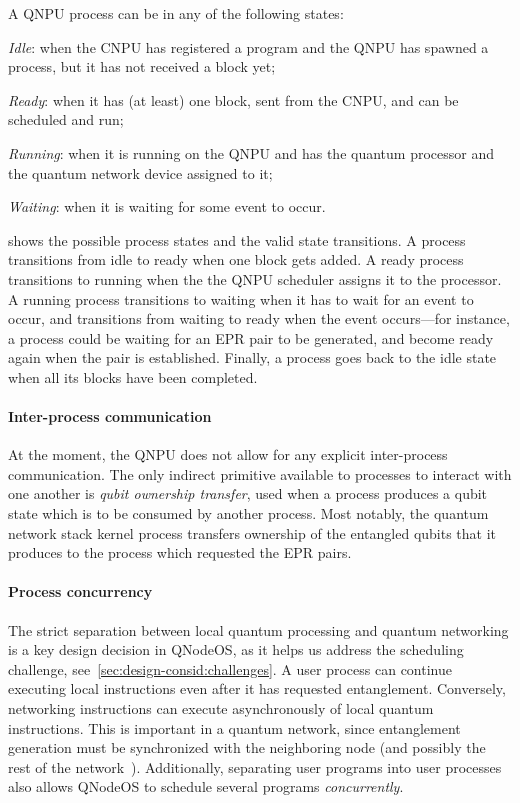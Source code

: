 A \ac{QNPU} process can be in any of the following states:
%
\begin{inlinelist}
\item \emph{Idle}: when the \ac{CNPU} has registered a program and the \ac{QNPU} has spawned a process, but it has not received a block yet;
\item \emph{Ready}: when it has (at least) one block, sent from the \ac{CNPU}, and can be scheduled and run;
\item \emph{Running}: when it is running on the \ac{QNPU} and has the quantum processor and the quantum network device assigned to it;
\item \emph{Waiting}: when it is waiting for some event to occur.
\end{inlinelist}
%
 shows the possible process states and the valid state transitions. A process transitions from idle to ready when one block gets added. A ready process transitions to running when the the \ac{QNPU} scheduler assigns it to the processor. A running process transitions to waiting when it has to wait for an event to occur, and transitions from waiting to ready when the event occurs---for instance, a process could be waiting for an \ac{EPR} pair to be generated, and become ready again when the pair is established. Finally, a process goes back to the idle state when all its blocks have been completed.

\paragraph{Inter-process communication}

At the moment, the \ac{QNPU} does not allow for any explicit inter-process communication. The only indirect primitive available to processes to interact with one another is \emph{qubit ownership transfer}, used when a process produces a qubit state which is to be consumed by another process. Most notably, the quantum network stack kernel process transfers ownership of the entangled qubits that it produces to the process which requested the \ac{EPR} pairs.

\paragraph{Process concurrency}

The strict separation between local quantum processing and quantum networking is a key design decision in \ac{QNodeOS}, as it helps us address the scheduling challenge, see~\cref{sec:design-consid:challenges}. A user process can continue executing local instructions even after it has requested entanglement. Conversely, networking instructions can execute asynchronously of local quantum instructions. This is important in a quantum network, since entanglement generation must be synchronized with the neighboring node (and possibly the rest of the network~\cite{skrzypczyk_2021_arch}). Additionally, separating user programs into user processes also allows \ac{QNodeOS} to schedule several programs \emph{concurrently}.

